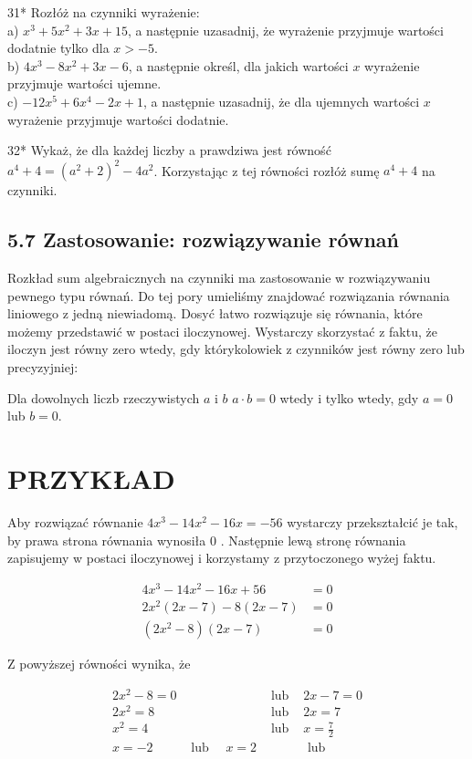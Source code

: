 \documentclass[10pt]{article}
\begin{document}
31* Rozłóż na czynniki wyrażenie:\\
a) \(x^{3}+5 x^{2}+3 x+15\), a następnie uzasadnij, że wyrażenie przyjmuje wartości dodatnie tylko dla \(x>-5\).\\
b) \(4 x^{3}-8 x^{2}+3 x-6\), a następnie określ, dla jakich wartości \(x\) wyrażenie przyjmuje wartości ujemne.\\
c) \(-12 x^{5}+6 x^{4}-2 x+1\), a następnie uzasadnij, że dla ujemnych wartości \(x\) wyrażenie przyjmuje wartości dodatnie.

32* Wykaż, że dla każdej liczby a prawdziwa jest równość\\
\(a^{4}+4=\left(a^{2}+2\right)^{2}-4 a^{2}\). Korzystając z tej równości rozłóż sumę \(a^{4}+4\) na czynniki.

\subsection*{5.7 Zastosowanie: rozwiązywanie równań}
Rozkład sum algebraicznych na czynniki ma zastosowanie w rozwiązywaniu pewnego typu równań. Do tej pory umieliśmy znajdować rozwiązania równania liniowego z jedną niewiadomą. Dosyć łatwo rozwiązuje się równania, które możemy przedstawić w postaci iloczynowej. Wystarczy skorzystać z faktu, że iloczyn jest równy zero wtedy, gdy którykolowiek z czynników jest równy zero lub precyzyjniej:

Dla dowolnych liczb rzeczywistych \(a\) i \(b\) \(a \cdot b=0\) wtedy i tylko wtedy, gdy \(a=0\) lub \(b=0\).

\section*{PRZYKŁAD}
Aby rozwiązać równanie \(4 x^{3}-14 x^{2}-16 x=-56\) wystarczy przekształcić je tak, by prawa strona równania wynosiła 0 . Następnie lewą stronę równania zapisujemy w postaci iloczynowej i korzystamy z przytoczonego wyżej faktu.

\[
\begin{aligned}
4 x^{3}-14 x^{2}-16 x+56 & =0 \\
2 x^{2}(2 x-7)-8(2 x-7) & =0 \\
\left(2 x^{2}-8\right)(2 x-7) & =0
\end{aligned}
\]

Z powyższej równości wynika, że

\[
\begin{aligned}
2 x^{2}-8=0 & & \text { lub } & 2 x-7=0 \\
2 x^{2}=8 & & \text { lub } & 2 x=7 \\
x^{2}=4 & & \text { lub } & x=\frac{7}{2} \\
x=-2 & \text { lub } \quad x=2 & & \text { lub }
\end{aligned}
\]
\end{document}
